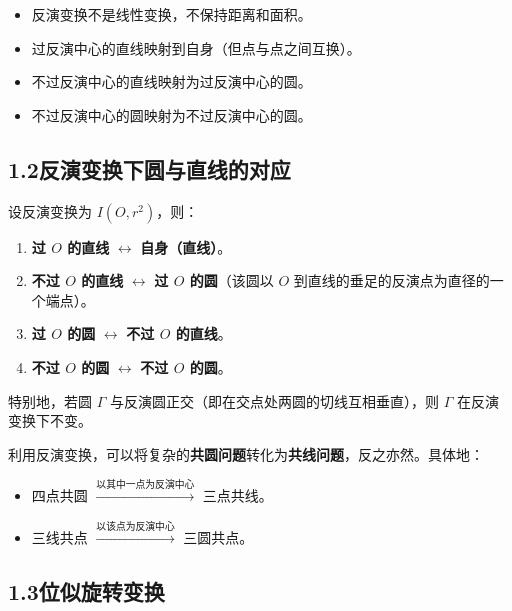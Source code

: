\documentclass[12pt, a4paper]{ctexart}
\begin{document}
\begin{warnbox}[易错提醒]
\begin{itemize}
  \item 反演变换不是线性变换，不保持距离和面积。
  \item 过反演中心的直线映射到自身（但点与点之间互换）。
  \item 不过反演中心的直线映射为过反演中心的圆。
  \item 不过反演中心的圆映射为不过反演中心的圆。
\end{itemize}
\end{warnbox}

\subsection*{1.2\quad 反演变换下圆与直线的对应}

\begin{knowledgebox}[圆与直线的反演对应关系]
设反演变换为 $I(O, r^2)$，则：
\begin{enumerate}[label=(\arabic*)]
  \item \textbf{过 $O$ 的直线} $\longleftrightarrow$ \textbf{自身（直线）}。
  \item \textbf{不过 $O$ 的直线} $\longleftrightarrow$ \textbf{过 $O$ 的圆}（该圆以 $O$ 到直线的垂足的反演点为直径的一个端点）。
  \item \textbf{过 $O$ 的圆} $\longleftrightarrow$ \textbf{不过 $O$ 的直线}。
  \item \textbf{不过 $O$ 的圆} $\longleftrightarrow$ \textbf{不过 $O$ 的圆}。
\end{enumerate}

特别地，若圆 $\Gamma$ 与反演圆正交（即在交点处两圆的切线互相垂直），则 $\Gamma$ 在反演变换下不变。
\end{knowledgebox}

\begin{tipbox}
利用反演变换，可以将复杂的\textbf{共圆问题}转化为\textbf{共线问题}，反之亦然。具体地：
\begin{itemize}
  \item 四点共圆 $\xrightarrow{\text{以其中一点为反演中心}}$ 三点共线。
  \item 三线共点 $\xrightarrow{\text{以该点为反演中心}}$ 三圆共点。
\end{itemize}
\end{tipbox}

\subsection*{1.3\quad 位似旋转变换}
\end{document}
